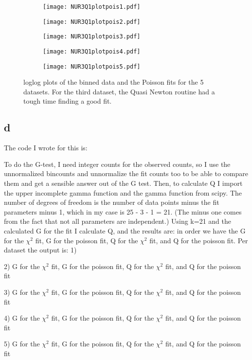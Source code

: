 \begin{figure}[ht]
    \begin{subfigure}{.49\textwidth}
       \centering
    \texttt{[image: NUR3Q1plotpois1.pdf]}
    \centering
    \subcaption{}
    \label{}
    \end{subfigure}
    \hfill
    \begin{subfigure}{.49\textwidth}
       \centering
    \texttt{[image: NUR3Q1plotpois2.pdf]}
    \centering
    \subcaption{}
    \label{}
    \end{subfigure}
     \begin{subfigure}{.49\textwidth}
       \centering
    \texttt{[image: NUR3Q1plotpois3.pdf]}
    \centering
    \subcaption{}
    \label{}
    \end{subfigure}
     \begin{subfigure}{.49\textwidth}
       \centering
    \texttt{[image: NUR3Q1plotpois4.pdf]}
    \centering
    \subcaption{}
    \label{}
    \end{subfigure}
     \begin{subfigure}{.49\textwidth}
       \centering
    \texttt{[image: NUR3Q1plotpois5.pdf]}
    \centering
    \subcaption{}
    \label{}
    \end{subfigure}
    \caption{loglog plots of the binned data and the Poisson fits for the 5 datasets. For the third dataset, the Quasi Newton routine had a tough time finding a good fit.}
    \label{fig:fig3}
\end{figure}


\subsection*{d}

The code I wrote for this is:


To do the G-test, I need integer counts for the observed counts, so I use the unnormalized bincounts and unnormalize the fit counts too to be able to compare them and get a sensible answer out of the G test.
Then, to calculate Q I import the upper incomplete gamma function and the gamma function from scipy. The number of degrees of freedom is the number of data points minus the fit parameters minus 1, which in my case is 25 - 3 - 1 = 21. (The minus one comes from the fact that not all parameters are independent.)
Using k=21 and the calculated G for the fit I calculate Q, and the results are:
in order we have the G for the $\chi^2$ fit, G for the poisson fit, Q for the $\chi^2$ fit, and Q for the poisson fit. Per dataset the output is: 
1)

2) G for the $\chi^2$ fit, G for the poisson fit, Q for the $\chi^2$ fit, and Q for the poisson fit

3) G for the $\chi^2$ fit, G for the poisson fit, Q for the $\chi^2$ fit, and Q for the poisson fit

4) G for the $\chi^2$ fit, G for the poisson fit, Q for the $\chi^2$ fit, and Q for the poisson fit

5) G for the $\chi^2$ fit, G for the poisson fit, Q for the $\chi^2$ fit, and Q for the poisson fit



